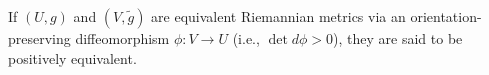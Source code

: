 If $(U, g)$ and $(V, \tilde{g})$ are equivalent Riemannian metrics via an orientation-preserving diffeomorphism $\phi: V \rightarrow U$ (i.e., $\det d\phi > 0$), they are said to be positively equivalent.
